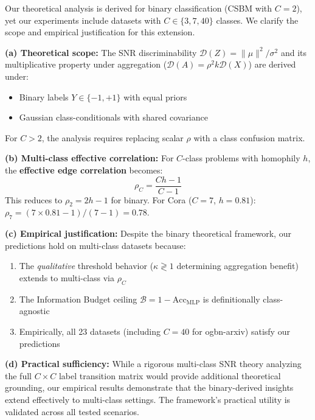 \begin{remark}
\label{rem:multiclass_extension}
Our theoretical analysis is derived for binary classification (CSBM with $C = 2$), yet our experiments include datasets with $C \in \{3, 7, 40\}$ classes. We clarify the scope and empirical justification for this extension.

\textbf{(a) Theoretical scope:}
The SNR discriminability $\mathcal{D}(Z) = \|\mu\|^2 / \sigma^2$ and its multiplicative property under aggregation ($\mathcal{D}(A) = \rho^2 k \mathcal{D}(X)$) are derived under:
\begin{itemize}
    \item Binary labels $Y \in \{-1, +1\}$ with equal priors
    \item Gaussian class-conditionals with shared covariance
\end{itemize}
For $C > 2$, the analysis requires replacing scalar $\rho$ with a class confusion matrix.

\textbf{(b) Multi-class effective correlation:}
For $C$-class problems with homophily $h$, the \textbf{effective edge correlation} becomes:
\begin{equation}
    \rho_C = \frac{Ch - 1}{C - 1}
\end{equation}
This reduces to $\rho_2 = 2h - 1$ for binary. For Cora ($C = 7$, $h = 0.81$): $\rho_7 = (7 \times 0.81 - 1)/(7-1) = 0.78$.

\textbf{(c) Empirical justification:}
Despite the binary theoretical framework, our predictions hold on multi-class datasets because:
\begin{enumerate}
    \item The \textit{qualitative} threshold behavior ($\kappa \gtrless 1$ determining aggregation benefit) extends to multi-class via $\rho_C$
    \item The Information Budget ceiling $\mathcal{B} = 1 - \text{Acc}_{\text{MLP}}$ is definitionally class-agnostic
    \item Empirically, all 23 datasets (including $C = 40$ for ogbn-arxiv) satisfy our predictions
\end{enumerate}

\textbf{(d) Practical sufficiency:}
While a rigorous multi-class SNR theory analyzing the full $C \times C$ label transition matrix would provide additional theoretical grounding, our empirical results demonstrate that the binary-derived insights extend effectively to multi-class settings. The framework's practical utility is validated across all tested scenarios.
\end{remark}

